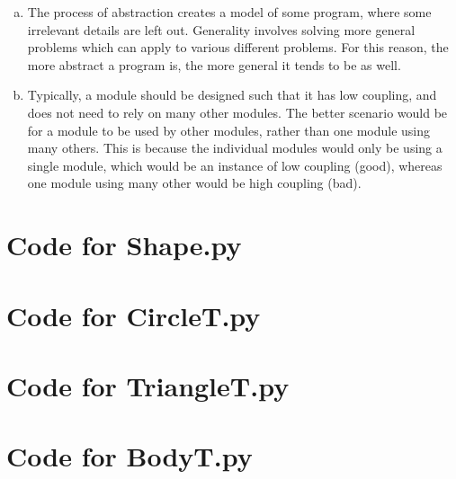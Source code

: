\documentclass[12pt]{article}
\begin{document}
\begin{enumerate}[a)]
\item The process of abstraction creates a model of some program, where some irrelevant details are left out. Generality involves solving more general problems which can apply to various different problems. For this reason, the more abstract a program is, the more general it tends to be as well.

\item Typically, a module should be designed such that it has low coupling, and does not need to rely on many other modules. The better scenario would be for a module to be used by other modules, rather than one module using many others. This is because the individual modules would only be using a single module, which would be an instance of low coupling (good), whereas one module using many other would be high coupling (bad).

\end{enumerate}

\newpage

\lstset{language=Python, basicstyle=\tiny, breaklines=true, showspaces=false,
  showstringspaces=false, breakatwhitespace=true}

\def\thesection{\Alph{section}}

\section{Code for Shape.py}

\noindent 

\newpage

\section{Code for CircleT.py}

\noindent 

\newpage

\section{Code for TriangleT.py}

\noindent 

\newpage

\section{Code for BodyT.py}
\end{document}
